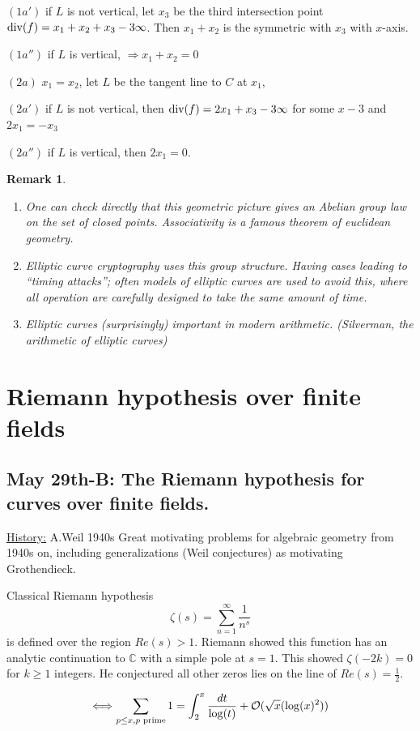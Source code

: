 \documentclass[11pt]{article}
\newtheorem{rmk}[thm]{Remark}
\newcommand{\cplx}{\mathbb C}
\newcommand{\calo}{{\cal O}}
\renewcommand{\div}{\textnormal{div}}
\newcommand{\Lrta}{\Longrightarrow}
\newcommand{\Llrta}{\Longleftrightarrow}
\begin{document}
$(1a')$ if $L$ is not vertical, let $x_3$
 be the third  intersection point $\div(f)=x_1+x_2+x_3-3\infty$. Then $x_1+x_2$ is the symmetric with $x_3$ with $x$-axis.

 $(1a'')$ if $L$ is vertical, $\Lrta x_1+x_2=0$

$(2a)$ $x_1=x_2$, let $L$ be the tangent line to $C$ at $x_1$, 

$(2a')$ if $L$ is not vertical, then $\div(f)=2x_1+x_3-3\infty$ for some $x-3$ and $2x_1=-x_3$

$(2a'')$
 if $L$ is vertical, then $2x_1=0$.

\begin{rmk}\ 
\begin{enumerate}[label=(\arabic*)]
\item One can check directly that this geometric picture gives an Abelian group law on the set of closed points. Associativity is a famous theorem of euclidean geometry.
\item Elliptic curve cryptography uses this group structure. Having cases leading to ``timing attacks''; often models of elliptic curves are used to avoid this, where all operation are carefully designed to take the same amount of time.
\item Elliptic curves (surprisingly) important in modern arithmetic. (Silverman, the arithmetic of elliptic curves)
\end{enumerate}
\end{rmk}
\section{Riemann hypothesis over finite fields}
\subsection{May 29th-B: The Riemann hypothesis for curves over finite fields.}

\underline{History:} A.Weil 1940s Great motivating problems for algebraic geometry from 1940s on, including generalizations
(Weil conjectures) as motivating Grothendieck.

Classical Riemann hypothesis
$$
\zeta(s)=\sum_{n=1}^\infty \frac{1}{n^s}
$$
is defined over the region $Re(s)>1$. Riemann showed this function has an analytic continuation to $\cplx$ with a simple pole at $s=1$. This showed $\zeta(-2k)=0$ for $k\geq 1$ integers. He conjectured all other zeros lies on the line of $Re(s)=\frac{1}{2}$.

$$\Llrta\sum_{p\leq x, p\text{ prime}}1=\int^x_2\frac{dt}{\log(t)}+\calo(\sqrt{x}(\log(x)^2))$$
\end{document}
